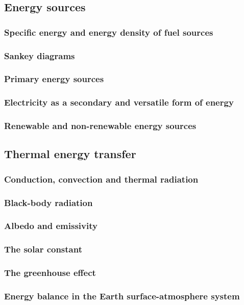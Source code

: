 \subsection{Energy sources}

\subsubsection{Specific energy and energy density of fuel sources}


\subsubsection{Sankey diagrams}


\subsubsection{Primary energy sources}


\subsubsection{Electricity as a secondary and versatile form of energy}


\subsubsection{Renewable and non-renewable energy sources}


\subsection{Thermal energy transfer}

\subsubsection{Conduction, convection and thermal radiation}


\subsubsection{Black-body radiation}


\subsubsection{Albedo and emissivity}


\subsubsection{The solar constant}


\subsubsection{The greenhouse effect}


\subsubsection{Energy balance in the Earth surface-atmosphere system}




